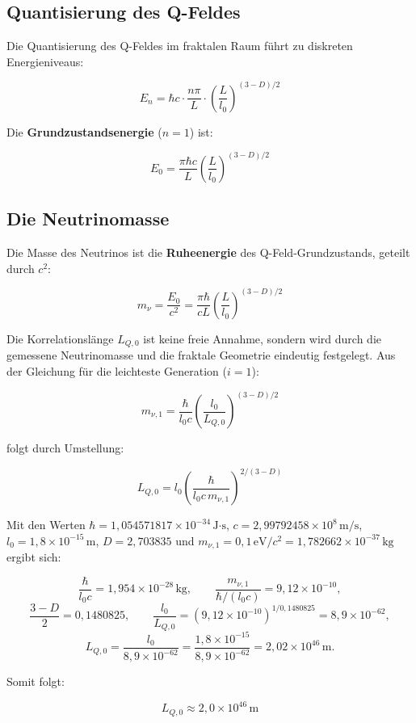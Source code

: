 \subsection{Quantisierung des Q-Feldes}

Die Quantisierung des Q-Feldes im fraktalen Raum führt zu diskreten Energieniveaus:

\[
E_n = \hbar c \cdot \frac{n\pi}{L} \cdot \left(\frac{L}{l_0}\right)^{(3-D)/2}
\]

Die \textbf{Grundzustandsenergie} (\( n=1 \)) ist:

\[
E_0 = \frac{\pi \hbar c}{L} \left(\frac{L}{l_0}\right)^{(3-D)/2}
\]

\subsection{Die Neutrinomasse}

Die Masse des Neutrinos ist die \textbf{Ruheenergie} des Q-Feld-Grundzustands, geteilt durch \( c^2 \):

\[
m_\nu = \frac{E_0}{c^2} = \frac{\pi \hbar}{c L} \left(\frac{L}{l_0}\right)^{(3-D)/2}
\]

Die Korrelationslänge \( L_{Q,0} \) ist keine freie Annahme, sondern wird durch die gemessene Neutrinomasse und die fraktale Geometrie eindeutig festgelegt. Aus der Gleichung für die leichteste Generation (\( i=1 \)):

\[
m_{\nu,1} = \frac{\hbar}{l_0 c} \left( \frac{l_0}{L_{Q,0}} \right)^{(3-D)/2}
\]

folgt durch Umstellung:

\[
L_{Q,0} = l_0 \left( \frac{\hbar}{l_0 c \, m_{\nu,1}} \right)^{2/(3-D)}
\]

Mit den Werten \( \hbar = 1{,}054571817 \times 10^{-34}\,\text{J·s} \), \( c = 2{,}99792458 \times 10^8\,\text{m/s} \), \( l_0 = 1{,}8 \times 10^{-15}\,\text{m} \), \( D = 2{,}703835 \) und \( m_{\nu,1} = 0{,}1\,\text{eV}/c^2 = 1{,}782662 \times 10^{-37}\,\text{kg} \) ergibt sich:

\[
\frac{\hbar}{l_0 c} = 1{,}954 \times 10^{-28}\,\text{kg}, \qquad
\frac{m_{\nu,1}}{\hbar/(l_0 c)} = 9{,}12 \times 10^{-10},
\]
\[
\frac{3-D}{2} = 0{,}1480825, \qquad
\frac{l_0}{L_{Q,0}} = (9{,}12 \times 10^{-10})^{1/0{,}1480825} = 8{,}9 \times 10^{-62},
\]
\[
L_{Q,0} = \frac{l_0}{8{,}9 \times 10^{-62}} = \frac{1{,}8 \times 10^{-15}}{8{,}9 \times 10^{-62}} = 2{,}02 \times 10^{46}\,\text{m}.
\]

Somit folgt:

\[
\boxed{L_{Q,0} \approx 2{,}0 \times 10^{46}\,\text{m}}
\]

